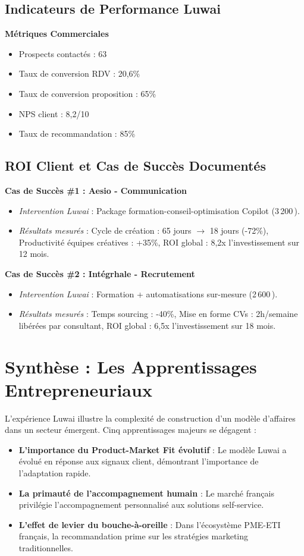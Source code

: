 \subsection{Indicateurs de Performance Luwai}

\textbf{Métriques Commerciales}
\begin{itemize}
    \item Prospects contactés : 63
    \item Taux de conversion RDV : 20,6\%
    \item Taux de conversion proposition : 65\%
    \item NPS client : 8,2/10
    \item Taux de recommandation : 85\%
\end{itemize}

\subsection{ROI Client et Cas de Succès Documentés}

\textbf{Cas de Succès \#1 : Aesio - Communication}
\begin{itemize}
    \item \emph{Intervention Luwai} : Package formation-conseil-optimisation Copilot (3\,200\,\texteuro{}).
    \item \emph{Résultats mesurés} : Cycle de création : 65 jours $\rightarrow$ 18 jours (-72\%), Productivité équipes créatives : +35\%, ROI global : 8,2x l'investissement sur 12 mois.
\end{itemize}

\textbf{Cas de Succès \#2 : Intégrhale - Recrutement}
\begin{itemize}
    \item \emph{Intervention Luwai} : Formation + automatisations sur-mesure (2\,600\,\texteuro{}).
    \item \emph{Résultats mesurés} : Temps sourcing : -40\%, Mise en forme CVs : 2h/semaine libérées par consultant, ROI global : 6,5x l'investissement sur 18 mois.
\end{itemize}

\section{Synthèse : Les Apprentissages Entrepreneuriaux}

L'expérience Luwai illustre la complexité de construction d'un modèle d'affaires dans un secteur émergent. Cinq apprentissages majeurs se dégagent :

\begin{itemize}
    \item \textbf{L'importance du Product-Market Fit évolutif} : Le modèle Luwai a évolué en réponse aux signaux client, démontrant l'importance de l'adaptation rapide.
    \item \textbf{La primauté de l'accompagnement humain} : Le marché français privilégie l'accompagnement personnalisé aux solutions self-service.
    \item \textbf{L'effet de levier du bouche-à-oreille} : Dans l'écosystème PME-ETI français, la recommandation prime sur les stratégies marketing traditionnelles.
\end{itemize}
